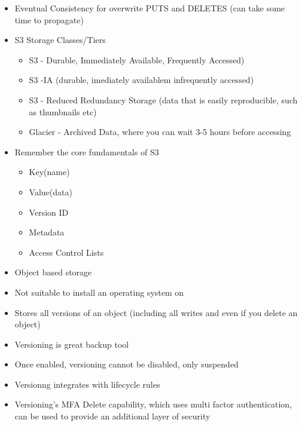 \documentclass{article}
\begin{document}
\begin{itemize}
\item
Eventual Consistency for overwrite PUTS and DELETES (can take some time to propagate)

\item
S3 Storage Classes/Tiers
	\begin{itemize}
	\item
	S3 - Durable, Immediately Available, Frequently Accessed)
	
	\item
	S3 -IA (durable, imediately availablem infrequently accessed)
	
	\item
	S3 - Reduced Redundancy Storage (data that is easily reproducible, such as thumbnails etc)
	
	\item
	Glacier - Archived Data, where you can wait 3-5  hours before accessing
	\end{itemize}

\item
Remember the core fundamentals of S3
	\begin{itemize}
	\item
	Key(name)
	
	\item	
	Value(data)
	
	\item
	Version ID
	
	\item
	Metadata
	
	\item
	Access Control Lists
	\end{itemize}

\item
Object based storage

\item
Not suitable to install an operating system on

\item
Stores all versions of an object (including all writes and even if you delete an object)

\item
Versioning is great backup tool

\item
Once enabled, versioning cannot be disabled, only suspended

\item
Versionng integrates with lifecycle rules

\item
Versioning's MFA Delete capability, which uses multi factor authentication, can be used to provide an additional layer of security


\end{itemize}
\end{document}
